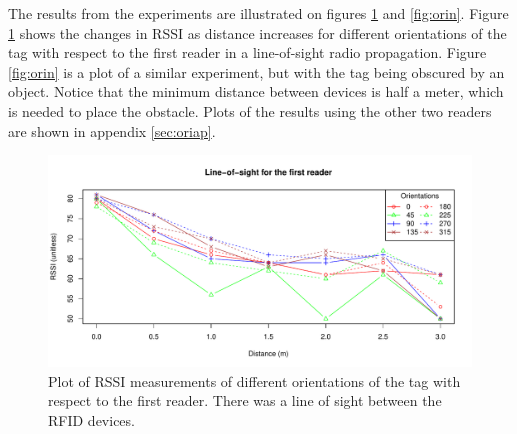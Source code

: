 The results from the experiments are illustrated on figures \ref{fig:oril} and \ref{fig:orin}. Figure \ref{fig:oril} shows the changes in RSSI as distance increases for different orientations of the tag with respect to the first reader in a line-of-sight radio propagation. Figure \ref{fig:orin} is a plot of a similar experiment, but with the tag being obscured by an object. Notice that the minimum distance between devices is half a meter, which is needed to place the obstacle. Plots of the results using the other two readers are shown in appendix \ref{sec:oriap}.
\begin{figure}[H]
	\begin{center}
		\includegraphics[width=1\textwidth]{figures/rssi_distance_3m_los_r1}
		\caption{Plot of RSSI measurements of different orientations of the tag with respect to the first reader. There was  a line of sight between the RFID devices.}
		\label{fig:oril}
	\end{center}
\end{figure}

